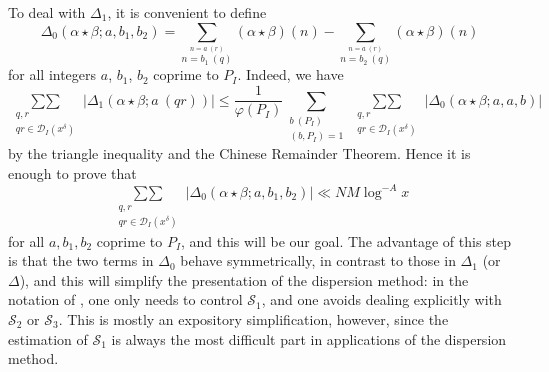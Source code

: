 \documentclass[12pt,a4paper,reqno]{amsart}
\numberwithin{equation}{section}
\theoremstyle{plain}
\theoremstyle{definition}
\newcommand{\DIone}[2]{\mathcal{D}_{{#1}}({#2})}
\def\stacksum#1#2{{\stackrel{{\scriptstyle #1}}
{{\scriptstyle #2}}}}
\newcommand\sumsum{\mathop{\sum\sum}\limits}
\renewcommand{\phi}{\varphi}
\begin{document}
To deal with $\Delta_1$, it is convenient to define
$$
\Delta_0(\alpha\star\beta;a,b_1,b_2)= \sum_\stacksum{n = a\ (r)}{ n=
  b_1\ (q)} (\alpha \star \beta)(n) - \sum_\stacksum{n = a\ (r)}{n =
  b_2\ (q)} (\alpha \star \beta)(n)
$$
for all integers $a$, $b_1$, $b_2$ coprime to $P_I$. Indeed, we have
$$
\sumsum_{\substack{q,r\\qr \in \DIone{I}{x^\delta}}} |\Delta_1(\alpha
\star \beta; a\ (qr))| \leq \frac{1}{\phi(P_I)} \sum_{\substack{b\
    (P_I)\\(b,P_I)=1}} \sumsum_{\substack{q,r\\qr \in
    \DIone{I}{x^\delta}}} |\Delta_0(\alpha\star\beta;a,a,b)|
$$
by the triangle inequality and the Chinese Remainder Theorem. Hence it
is enough to prove that
\begin{equation}\label{straw-2}
  \sumsum_{\substack{q,r\\qr \in \DIone{I}{x^\delta}}}|\Delta_0(\alpha\star\beta;a,b_1,b_2)|
  \ll  NM \log^{-A} x
\end{equation}
for all $a,b_1,b_2$ coprime to $P_I$, and this will be our goal.  The
advantage of this step is that the two terms in $\Delta_0$ behave
symmetrically, in contrast to those in $\Delta_1$ (or $\Delta$), and
this will simplify the presentation of the dispersion method: in the
notation of \cite{bfi,linnik,zhang}, one only
needs to control ${\mathcal S}_1$, and one avoids dealing explicitly
with ${\mathcal S}_2$ or ${\mathcal S}_3$.  This is mostly an
expository simplification, however, since the estimation of ${\mathcal
  S}_1$ is always the most difficult part in applications of the
dispersion method.
\end{document}
